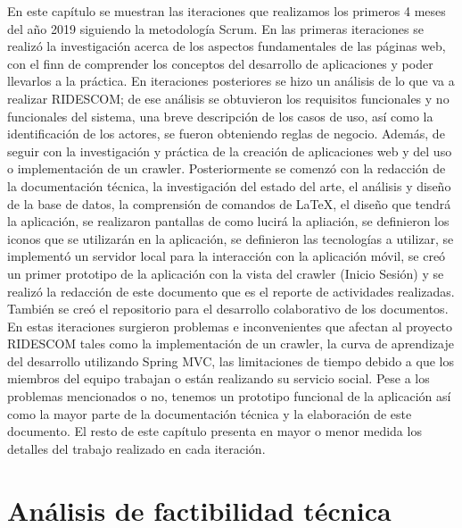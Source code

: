 	\noindent En este capítulo se muestran las iteraciones que realizamos los primeros 4 meses del año 2019 siguiendo la metodología Scrum. En las primeras iteraciones se realizó la investigación acerca de los aspectos fundamentales de las páginas web, con el finn de comprender los conceptos del desarrollo de aplicaciones y poder llevarlos a la práctica. En iteraciones posteriores se hizo un análisis de lo que va a realizar RIDESCOM; de ese análisis se obtuvieron los requisitos funcionales y no funcionales del sistema, una breve descripción de los casos de uso, así como la identificación de los actores, se fueron obteniendo reglas de negocio. Además, de seguir con la investigación y práctica de la creación de aplicaciones web y del uso o implementación de un crawler. Posteriormente se comenzó con la redacción de la documentación técnica, la investigación del estado del arte, el análisis y diseño de la base de datos, la comprensión de comandos de LaTeX, el diseño que tendrá la aplicación, se realizaron pantallas de como lucirá la apliación, se definieron los iconos que se utilizarán en la aplicación, se definieron las tecnologías a utilizar, se implementó un servidor local para la interacción con la aplicación móvil, se creó un primer prototipo de la aplicación con la vista del crawler (Inicio Sesión) y se realizó la redacción de este documento que es el reporte de actividades realizadas. También se creó el repositorio para el desarrollo colaborativo de los documentos. En estas iteraciones surgieron problemas e inconvenientes que afectan al proyecto RIDESCOM tales como la implementación de un crawler, la curva de aprendizaje del desarrollo utilizando Spring MVC, las limitaciones de tiempo debido a que los miembros del equipo trabajan o están realizando su servicio social. Pese a los problemas mencionados o no, tenemos un prototipo funcional de la aplicación así como la mayor parte de la documentación técnica y la elaboración de este documento. El resto de este capítulo presenta en mayor o menor medida los detalles del trabajo realizado en cada iteración.
	
	\section{An\'alisis de factibilidad t\'ecnica}
	
